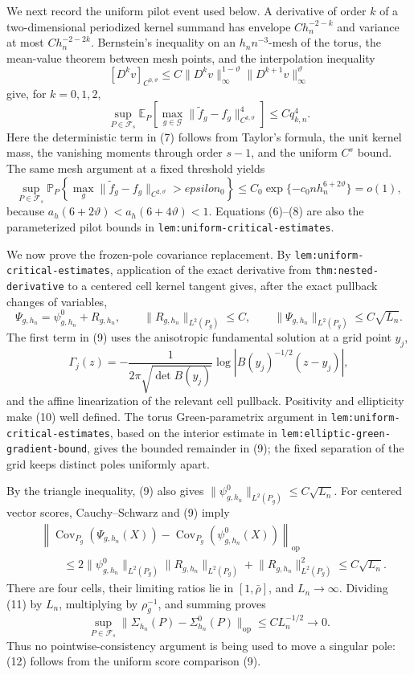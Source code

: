 We next record the uniform pilot event used below.  A derivative of order \(k\) of a two-dimensional periodized kernel summand has envelope \(Ch_n^{-2-k}\) and variance at most \(Ch_n^{-2-2k}\).  Bernstein's inequality on an \(h_n n^{-3}\)-mesh of the torus, the mean-value theorem between mesh points, and the interpolation inequality
\[
 [D^k v]_{C^{0,\vartheta}}
 \leq C\lVert D^k v\rVert_\infty^{1-\vartheta}
          \lVert D^{k+1}v\rVert_\infty^\vartheta
\tag{6}
\]
give, for \(k=0,1,2\),
\[
 \sup_{P\in\mathcal F_s}\mathbb E_P\!\left[
 \max_{g\in\mathcal G}
 \lVert\widetilde f_g-f_g\rVert_{C^{k,\vartheta}}^4\right]
 \leq Cq_{k,n}^4.
\tag{7}
\]
Here the deterministic term in (7) follows from Taylor's formula, the unit kernel mass, the vanishing moments through order \(s-1\), and the uniform \(C^s\) bound.  The same mesh argument at a fixed threshold yields
\[
 \sup_{P\in\mathcal F_s}\mathbb P_P\!\left\{
 \max_g\lVert\widetilde f_g-f_g\rVert_{C^{2,\vartheta}}>epsilon_0
 \right\}
 \leq C_0\exp\{-c_0nh_n^{6+2\vartheta}\}=o(1),
\tag{8}
\]
because \(a_h(6+2\vartheta)<a_h(6+4\vartheta)<1\).  Equations (6)--(8) are also the parameterized pilot bounds in
\texttt{lem:uniform-critical-estimates}.

We now prove the frozen-pole covariance replacement.  By
\texttt{lem:uniform-critical-estimates}, application of the exact derivative from
\texttt{thm:nested-derivative} to a centered cell kernel tangent gives, after the exact pullback changes of variables,
\[
 \Psi_{g,h_n}=\psi^0_{g,h_n}+R_{g,h_n},
 \qquad
 \lVert R_{g,h_n}\rVert_{L^2(P_g)}\leq C,
 \qquad
 \lVert\Psi_{g,h_n}\rVert_{L^2(P_g)}\leq C\sqrt{L_n}.
\tag{9}
\]
The first term in (9) uses the anisotropic fundamental solution at a grid point \(y_j\),
\[
 \Gamma_j(z)=-\frac{1}{2\pi\sqrt{\det B(y_j)}}
 \log\left|B(y_j)^{-1/2}(z-y_j)\right|,
\tag{10}
\]
and the affine linearization of the relevant cell pullback.  Positivity and ellipticity make (10) well defined.  The torus Green-parametrix argument in
\texttt{lem:uniform-critical-estimates}, based on the interior estimate in
\texttt{lem:elliptic-green-gradient-bound}, gives the bounded remainder in (9); the fixed separation of the grid keeps distinct poles uniformly apart.

By the triangle inequality, (9) also gives
\(\lVert\psi^0_{g,h_n}\rVert_{L^2(P_g)}\leq C\sqrt{L_n}\).  For centered vector scores, Cauchy--Schwarz and (9) imply
\[
 \begin{aligned}
 &\left\lVert
 \operatorname{Cov}_{P_g}(\Psi_{g,h_n}(X))
 -\operatorname{Cov}_{P_g}(\psi^0_{g,h_n}(X))
 \right\rVert_{\mathrm{op}}\\
 &\qquad\leq
 2\lVert\psi^0_{g,h_n}\rVert_{L^2(P_g)}
   \lVert R_{g,h_n}\rVert_{L^2(P_g)}
 +\lVert R_{g,h_n}\rVert_{L^2(P_g)}^2
 \leq C\sqrt{L_n}.
\end{aligned}
\tag{11}
\]
There are four cells, their limiting ratios lie in \([1,\bar\rho]\), and \(L_n\to\infty\).  Dividing (11) by \(L_n\), multiplying by \(\rho_g^{-1}\), and summing proves
\[
 \sup_{P\in\mathcal F_s}
 \lVert\Sigma_{h_n}(P)-\Sigma^0_{h_n}(P)\rVert_{\mathrm{op}}
 \leq C L_n^{-1/2}\longrightarrow0.
\tag{12}
\]
Thus no pointwise-consistency argument is being used to move a singular pole: (12) follows from the uniform score comparison (9).

